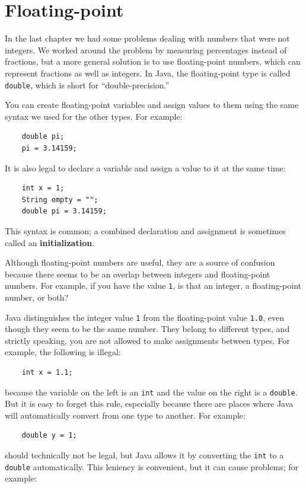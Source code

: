 \documentclass[12pt]{book}
\theoremstyle{exercise}
\begin{document}
\section{Floating-point}

In the last chapter we had some problems dealing with numbers
that were not integers.  We worked around the problem by measuring
percentages instead of fractions, but a more general solution is
to use floating-point numbers, which can represent fractions
as well as integers.  In Java, the floating-point type is
called {\tt double}, which is short for ``double-precision.''

You can create floating-point variables and assign values to them
using the same syntax we used for the other types.  For example:

\begin{lstlisting}
    double pi;
    pi = 3.14159;
\end{lstlisting}
%
It is also legal to declare a variable and assign a value to it at the
same time:

\begin{lstlisting}
    int x = 1;
    String empty = "";
    double pi = 3.14159;
\end{lstlisting}
%
This syntax is common; a combined declaration
and assignment is sometimes called an {\bf initialization}.

Although floating-point numbers are useful, they are
a source of confusion because there seems to be an
overlap between integers and floating-point numbers.  For
example, if you have the value {\tt 1}, is that an integer,
a floating-point number, or both?

Java distinguishes the integer value {\tt 1}
from the floating-point value {\tt 1.0}, even though they
seem to be the same number.  They belong to
different types, and strictly speaking, you are not allowed
to make assignments between types.  For example, the following
is illegal:

\begin{lstlisting}
    int x = 1.1;
\end{lstlisting}
%
because the variable on the left is an {\tt int}
and the value on the right is a {\tt double}.  But it is easy
to forget this rule, especially because there are places where Java
will automatically convert from one type to another.
For example:

\begin{lstlisting}
    double y = 1;
\end{lstlisting}
%
should technically not be legal, but Java allows it by converting the
{\tt int} to a {\tt double} automatically.  This leniency is
convenient, but it can cause problems; for example:
\end{document}

